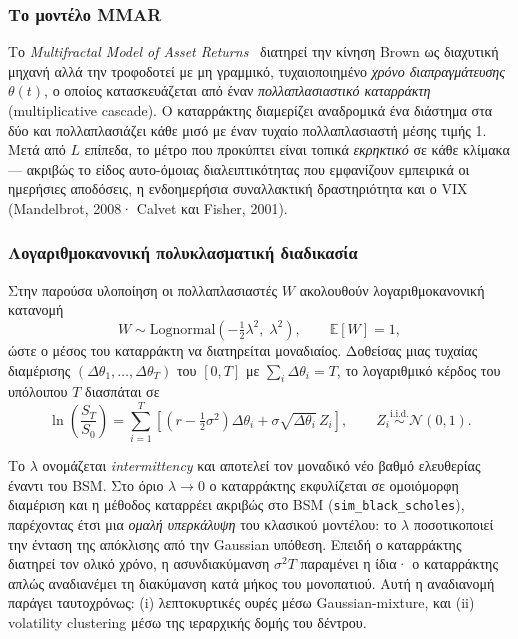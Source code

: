 \documentclass[12pt]{article}
\begin{document}
\subsubsection{Το μοντέλο MMAR}
Το \emph{Multifractal Model of Asset Returns}~\cite{MandelbrotFC1997} διατηρεί την κίνηση Brown ως διαχυτική μηχανή αλλά την τροφοδοτεί με μη γραμμικό, τυχαιοποιημένο \emph{χρόνο διαπραγμάτευσης} $\theta(t)$, ο οποίος κατασκευάζεται από έναν \emph{πολλαπλασιαστικό καταρράκτη} (multiplicative cascade). Ο καταρράκτης διαμερίζει αναδρομικά ένα διάστημα στα δύο και πολλαπλασιάζει κάθε μισό με έναν τυχαίο πολλαπλασιαστή μέσης τιμής 1. Μετά από $L$ επίπεδα, το μέτρο που προκύπτει είναι τοπικά \emph{εκρηκτικό} σε κάθε κλίμακα — ακριβώς το είδος αυτο-όμοιας διαλειπτικότητας που εμφανίζουν εμπειρικά οι ημερήσιες αποδόσεις, η ενδοημερήσια συναλλακτική δραστηριότητα και ο VIX (Mandelbrot, 2008· Calvet και Fisher, 2001).

\subsubsection{Λογαριθμοκανονική πολυκλασματική διαδικασία}
Στην παρούσα υλοποίηση οι πολλαπλασιαστές $W$ ακολουθούν λογαριθμοκανονική κατανομή
\[
  W \sim \mathrm{Lognormal}\!\left(-\tfrac{1}{2}\lambda^{2},\; \lambda^{2}\right), \qquad \mathbb{E}[W] = 1,
\]
ώστε ο μέσος του καταρράκτη να διατηρείται μοναδιαίος. Δοθείσας μιας τυχαίας διαμέρισης $(\Delta\theta_1, \dots, \Delta\theta_T)$ του $[0, T]$ με $\sum_i \Delta\theta_i = T$, το λογαριθμικό κέρδος του υπόλοιπου $T$ διασπάται σε
\[
  \ln\!\left(\frac{S_T}{S_0}\right)
   = \sum_{i=1}^{T} \left[\left(r - \tfrac{1}{2}\sigma^{2}\right)\Delta\theta_i + \sigma\sqrt{\Delta\theta_i}\, Z_i\right],
   \qquad Z_i \stackrel{\text{i.i.d.}}{\sim} \mathcal{N}(0,1).
\]

Το $\lambda$ ονομάζεται \emph{intermittency} και αποτελεί τον μοναδικό νέο βαθμό ελευθερίας έναντι του BSM. Στο όριο $\lambda \to 0$ ο καταρράκτης εκφυλίζεται σε ομοιόμορφη διαμέριση και η μέθοδος καταρρέει ακριβώς στο BSM (\texttt{sim\_black\_scholes}), παρέχοντας έτσι μια \emph{ομαλή υπερκάλυψη} του κλασικού μοντέλου: το $\lambda$ ποσοτικοποιεί την ένταση της απόκλισης από την Gaussian υπόθεση. Επειδή ο καταρράκτης διατηρεί τον ολικό χρόνο, η ασυνδιακύμανση $\sigma^{2} T$ παραμένει η ίδια· ο καταρράκτης απλώς αναδιανέμει τη διακύμανση κατά μήκος του μονοπατιού. Αυτή η αναδιανομή παράγει ταυτοχρόνως: (i) λεπτοκυρτικές ουρές μέσω Gaussian-mixture, και (ii) volatility clustering μέσω της ιεραρχικής δομής του δέντρου.
\end{document}
